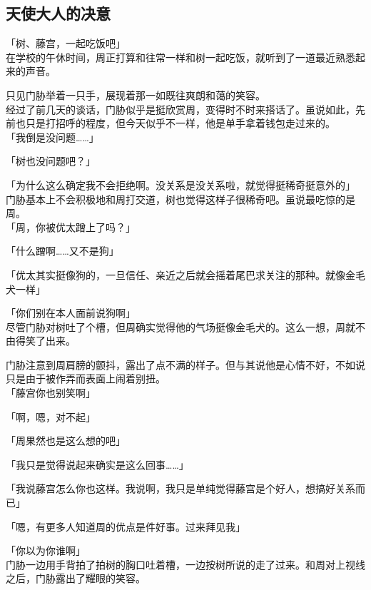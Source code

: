 \subsection{天使大人的决意}

「树、藤宫，一起吃饭吧」\\

在学校的午休时间，周正打算和往常一样和树一起吃饭，就听到了一道最近熟悉起来的声音。

只见门胁举着一只手，展现着那一如既往爽朗和蔼的笑容。\\

经过了前几天的谈话，门胁似乎是挺欣赏周，变得时不时来搭话了。虽说如此，先前也只是打招呼的程度，但今天似乎不一样，他是单手拿着钱包走过来的。\\

「我倒是没问题……」

「树也没问题吧？」

「为什么这么确定我不会拒绝啊。没关系是没关系啦，就觉得挺稀奇挺意外的」\\

门胁基本上不会积极地和周打交道，树也觉得这样子很稀奇吧。虽说最吃惊的是周。\\

「周，你被优太蹭上了吗？」

「什么蹭啊……又不是狗」

「优太其实挺像狗的，一旦信任、亲近之后就会摇着尾巴求关注的那种。就像金毛犬一样」

「你们别在本人面前说狗啊」\\

尽管门胁对树吐了个槽，但周确实觉得他的气场挺像金毛犬的。这么一想，周就不由得笑了出来。

门胁注意到周肩膀的颤抖，露出了点不满的样子。但与其说他是心情不好，不如说只是由于被作弄而表面上闹着别扭。\\

「藤宫你也别笑啊」

「啊，嗯，对不起」

「周果然也是这么想的吧」

「我只是觉得说起来确实是这么回事……」

「我说藤宫怎么你也这样。我说啊，我只是单纯觉得藤宫是个好人，想搞好关系而已」

「嗯，有更多人知道周的优点是件好事。过来拜见我」

「你以为你谁啊」\\

门胁一边用手背拍了拍树的胸口吐着槽，一边按树所说的走了过来。和周对上视线之后，门胁露出了耀眼的笑容。

